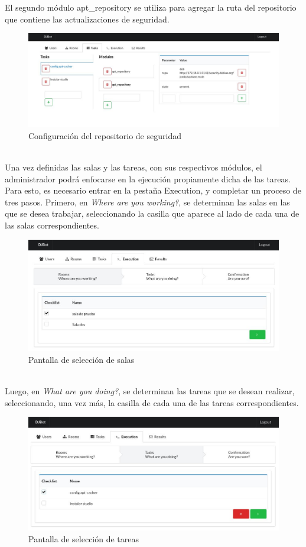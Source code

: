 \documentclass[a4paper,12pt]{article}
\begin{document}
El segundo módulo apt\_repository se utiliza para agregar la ruta del repositorio que contiene las actualizaciones de seguridad.\\
\begin{figure}[htb]
\centering
\includegraphics[width=.9\linewidth]{./img/security.module.jpg}
\caption{Configuración del repositorio de seguridad}
\end{figure}\\


Una vez definidas las salas y las tareas, con sus respectivos módulos, el administrador podrá enfocarse en la ejecución propiamente dicha de las tareas. Para esto, es necesario entrar en la pestaña Execution, y completar un proceso de tres pasos. Primero, en \emph{Where are you working?}, se determinan las salas en las que se desea trabajar, seleccionando la casilla que aparece al lado de cada una de las salas correspondientes.\\

\begin{figure}[htb]
\centering
\includegraphics[width=.9\linewidth]{./img/seleccion_de_salas.jpg}
\caption{Pantalla de selección de salas}
\end{figure} \\
Luego, en \emph{What are you doing?}, se determinan las tareas que se desean realizar, seleccionando, una vez  más, la casilla de cada una de las tareas correspondientes.\\

\begin{figure}[htb]
\centering
\includegraphics[width=.9\linewidth]{./img/seleccion_de_tareas.jpg}
\caption{Pantalla de selección de tareas}
\end{figure} \\
\end{document}
